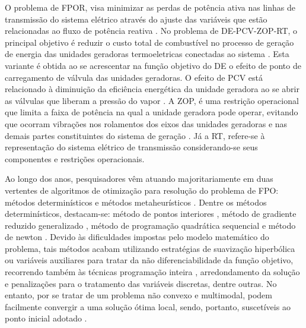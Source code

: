\documentclass[
	12pt,				%
	openany,			%
	twoside,			%
	a4paper,			%
	chapter=TITLE,		%
	section=Title,		%
	subsection=Title,	%
	subsubsection=Title,%
	english,			%
	french,				%
	spanish,			%
	brazil			%
	]{abntex2}
\begin{document}
\begin{ERRATA}
O problema de FPOR, visa minimizar as perdas de potência ativa nas linhas de transmissão do sistema elétrico através do ajuste das variáveis que estão relacionadas ao fluxo de potência reativa \cite{edilaine}. No problema de DE-PCV-ZOP-RT, o principal objetivo é reduzir o custo total de combustível no processo de geração de energia das unidades geradoras termoeletricas conectadas  ao sistema \cite{pinheiro}. Esta variante é obtida ao se acrescentar na função objetivo do DE o efeito de ponto de carregamento de válvula das unidades geradoras. O efeito de PCV está relacionado à diminuição da eficiência energética da unidade geradora ao se abrir as válvulas que liberam a pressão do vapor \cite{dissertacaodiego}. A ZOP, é uma restrição operacional que limita a faixa de potência na qual a unidade geradora pode operar, evitando que ocorram vibrações nos rolamentos dos eixos das unidades geradoras e nas demais partes constituintes do sistema de geração \cite{NIKNAM}. Já a RT, refere-se à representação do sistema elétrico de transmissão considerando-se seus componentes e restrições operacionais.

Ao longo dos anos, pesquisadores vêm atuando majoritariamente em duas vertentes de algoritmos de otimização para resolução do problema de FPO: métodos determinísticos \cite{detreview1} e métodos metaheurísticos \cite{metareview}. Dentre os métodos determinísticos, destacam-se: método de pontos interiores \cite{pinheiro}, método de gradiente reduzido generalizado \cite{reduced}, método de programação quadrática sequencial \cite{sqp} e  método de newton \cite{newton}. Devido às dificuldades impostas pelo modelo matemático do problema, tais métodos acabam utilizando estratégias de suavização hiperbólica \cite{dissertacaodiego} ou variáveis auxiliares \cite{pan2018hybrid} para tratar da não diferenciabilidade da função objetivo, recorrendo também às técnicas programação inteira \cite{silvaBranchandBound}, arredondamento da solução \cite{rounding} e penalizações \cite{edilaine} para o tratamento das variáveis discretas, dentre outras. No entanto, por se tratar de um problema não convexo e multimodal, podem facilmente convergir a uma solução ótima local, sendo, portanto, suscetíveis ao ponto inicial adotado \cite{psohibrido}. 


\end{ERRATA}
\end{document}
